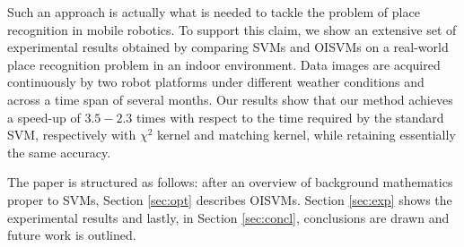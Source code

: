 Such an approach is actually what is needed to tackle the problem of
place recognition in mobile robotics. To support this claim, we show
an extensive set of experimental results obtained by comparing SVMs
and OISVMs on a real-world place recognition problem in an indoor
environment. Data images are acquired continuously by two robot
platforms under different weather conditions and across a time span of
several months. Our results show that our method achieves a speed-up
of $3.5-2.3$ times with respect to the time required by the standard SVM,
respectively with $\chi^2$ kernel and matching kernel,
while retaining essentially the same accuracy.

The paper is structured as follows: after an overview  of background
mathematics proper to SVMs,  Section \ref{sec:opt} describes OISVMs.
Section \ref{sec:exp} shows the experimental results and
lastly, in Section \ref{sec:concl}, conclusions are drawn and future
work is outlined.
